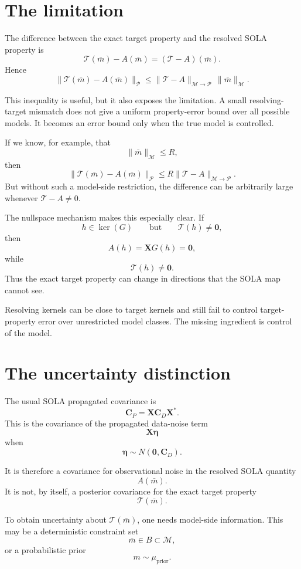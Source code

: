 \documentclass[11pt,openany]{book}
\theoremstyle{definition}
\theoremstyle{remark}
\newcommand{\M}{\mathcal M}
\newcommand{\Pspace}{\mathcal P}
\newcommand{\Tau}{\mathcal{T}}
\newcommand{\kernel}{\operatorname{ker}}
\begin{document}
\section{The limitation}

The difference between the exact target property and the resolved SOLA property is
\[
  \Tau(\bar m)-A(\bar m)
  =
  (\Tau-A)(\bar m).
\]
Hence
\[
  \|\Tau(\bar m)-A(\bar m)\|_{\Pspace}
  \le
  \|\Tau-A\|_{\M\to\Pspace}\,\|\bar m\|_{\M}.
\]

This inequality is useful, but it also exposes the limitation. A small resolving-target mismatch
does not give a uniform property-error bound over all possible models. It becomes an error
bound only when the true model is controlled.

If we know, for example, that
\[
  \|\bar m\|_{\M}\le R,
\]
then
\[
  \|\Tau(\bar m)-A(\bar m)\|_{\Pspace}
  \le
  R\|\Tau-A\|_{\M\to\Pspace}.
\]
But without such a model-side restriction, the difference can be arbitrarily large whenever
\(\Tau-A\neq 0\).

The nullspace mechanism makes this especially clear. If
\[
  h\in\kernel(G)
  \qquad\text{but}\qquad
  \Tau(h)\neq\mathbf 0,
\]
then
\[
  A(h)=\mathbf XG(h)=\mathbf 0,
\]
while
\[
  \Tau(h)\neq\mathbf 0.
\]
Thus the exact target property can change in directions that the SOLA map cannot see.

\begin{warningbox}
Resolving kernels can be close to target kernels and still fail to control target-property error
over unrestricted model classes. The missing ingredient is control of the model.
\end{warningbox}

\section{The uncertainty distinction}

The usual SOLA propagated covariance is
\[
  \mathbf C_P
  =
  \mathbf X\mathbf C_D\mathbf X^*.
\]
This is the covariance of the propagated data-noise term
\[
  \mathbf X\boldsymbol\eta
\]
when
\[
  \boldsymbol\eta\sim N(\mathbf 0,\mathbf C_D).
\]

It is therefore a covariance for observational noise in the resolved SOLA quantity
\[
  A(\bar m).
\]
It is not, by itself, a posterior covariance for the exact target property
\[
  \Tau(\bar m).
\]

To obtain uncertainty about \(\Tau(\bar m)\), one needs model-side information. This may be a
deterministic constraint set
\[
  \bar m\in B\subset\M,
\]
or a probabilistic prior
\[
  m\sim\mu_{\mathrm{prior}}.
\]
\end{document}
